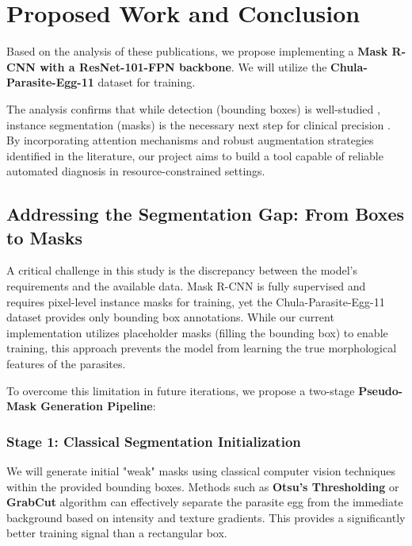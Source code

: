 \section{Proposed Work and Conclusion}
\label{sec:proposed_work}

Based on the analysis of these publications, we propose implementing a \textbf{Mask R-CNN with a ResNet-101-FPN backbone}. We will utilize the \textbf{Chula-Parasite-Egg-11} dataset \cite{anantrasirichai2022icip} for training.

The analysis confirms that while detection (bounding boxes) is well-studied \cite{viet2019parasite}, instance segmentation (masks) is the necessary next step for clinical precision \cite{cringoli2024automating}. By incorporating attention mechanisms \cite{wang2024automated} and robust augmentation strategies identified in the literature, our project aims to build a tool capable of reliable automated diagnosis in resource-constrained settings.

\subsection{Addressing the Segmentation Gap: From Boxes to Masks}
A critical challenge in this study is the discrepancy between the model's requirements and the available data. Mask R-CNN is fully supervised and requires pixel-level instance masks for training, yet the Chula-Parasite-Egg-11 dataset provides only bounding box annotations. While our current implementation utilizes placeholder masks (filling the bounding box) to enable training, this approach prevents the model from learning the true morphological features of the parasites.

To overcome this limitation in future iterations, we propose a two-stage \textbf{Pseudo-Mask Generation Pipeline}:

\subsubsection{Stage 1: Classical Segmentation Initialization}
We will generate initial "weak" masks using classical computer vision techniques within the provided bounding boxes. Methods such as \textbf{Otsu's Thresholding} or \textbf{GrabCut} algorithm can effectively separate the parasite egg from the immediate background based on intensity and texture gradients. This provides a significantly better training signal than a rectangular box.

